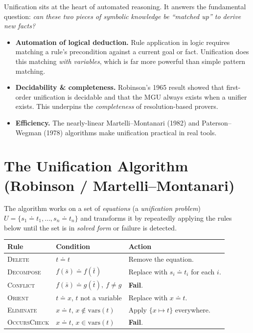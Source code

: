 \documentclass[11pt, a4paper]{article}
\begin{document}
Unification sits at the heart of automated reasoning. It answers the fundamental question:
\emph{can these two pieces of symbolic knowledge be ``matched up'' to derive new facts?}
 
\begin{itemize}[leftmargin=*, itemsep=4pt]
    \item \textbf{Automation of logical deduction.}
          Rule application in logic requires matching a rule's precondition against a
          current goal or fact. Unification does this matching \emph{with variables},
          which is far more powerful than simple pattern matching.
 
    \item \textbf{Decidability \& completeness.}
          Robinson's 1965 result showed that first-order unification is decidable and
          that the MGU always exists when a unifier exists. This underpins the
          \emph{completeness} of resolution-based provers.
 
    \item \textbf{Efficiency.}
          The nearly-linear Martelli–Montanari (1982) and Paterson–Wegman (1978)
          algorithms make unification practical in real tools.
\end{itemize}
 
\section{The Unification Algorithm (Robinson / Martelli--Montanari)}
 
The algorithm works on a set of \emph{equations} (a \emph{unification problem})
$U = \{s_1 \doteq t_1, \ldots, s_n \doteq t_n\}$ and transforms it by repeatedly
applying the rules below until the set is in \emph{solved form} or failure is detected.
 
\begin{center}
\renewcommand{\arraystretch}{1.4}
\begin{tabular}{lll}
\toprule
\textbf{Rule} & \textbf{Condition} & \textbf{Action} \\
\midrule
\textsc{Delete}    & $t \doteq t$                           & Remove the equation. \\
\textsc{Decompose} & $f(\bar{s}) \doteq f(\bar{t})$         & Replace with $s_i \doteq t_i$ for each $i$. \\
\textsc{Conflict}  & $f(\bar{s}) \doteq g(\bar{t}),\ f\neq g$ & \textbf{Fail}. \\
\textsc{Orient}    & $t \doteq x$, $t$ not a variable       & Replace with $x \doteq t$. \\
\textsc{Eliminate} & $x \doteq t$, $x \notin \mathrm{vars}(t)$ & Apply $\{x \mapsto t\}$ everywhere. \\
\textsc{OccursCheck} & $x \doteq t$, $x \in \mathrm{vars}(t)$ & \textbf{Fail}. \\
\bottomrule
\end{tabular}
\end{center}
 
\end{document}

